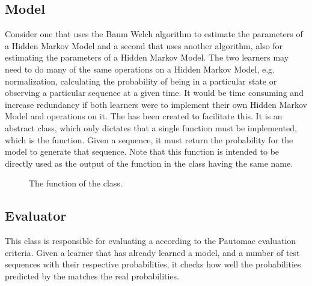 \subsection{Model}
Consider one  that uses the Baum Welch algorithm to estimate the parameters of a Hidden Markov Model and a second  that uses another algorithm, also for estimating the parameters of a Hidden Markov Model. The two learners may need to do many of the same operations on a Hidden Markov Model, e.g. normalization, calculating the probability of being in a particular state or observing a particular sequence at a given time. 
It would be time consuming and increase redundancy if both learners were to implement their own Hidden Markov Model and operations on it.
The  has been created to facilitate this. It is an abstract class, which only dictates that a single function must be implemented, which is the  function. Given a sequence, it must return the probability for the model to generate that sequence. Note that this function is intended to be directly used as the output of the function in the  class having the same name.

\begin{figure}
\caption{The  function of the  class.}
\label{code:learner}
\end{figure}


\subsection{Evaluator}
This class is responsible for evaluating a  according to the Pautomac evaluation criteria.
Given a learner that has already learned a model, and a number of test sequences with their respective probabilities, it checks how well the probabilities predicted by the  matches the real probabilities.


